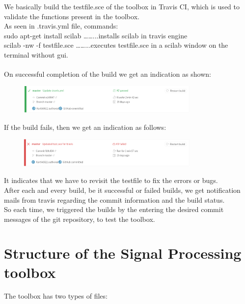 \documentclass[12pt,a4paper]{report}
\begin{document}
We basically build the testfile.sce of the toolbox in Travis CI, which is used to validate the functions present in the toolbox. \\
As seen in .travis.yml file, commands:\\
    sudo apt-get install scilab      ……...installs scilab in travis engine\\
    scilab -nw -f testfile.sce         ……...executes testfile.sce in a scilab window on the terminal without gui.\\\\

On successful completion of the build we get an indication as shown:\\
\begin{figure}[H]
\centering
\includegraphics[width = 0.8\textwidth]{travissuccess.png}
\end{figure}


If the build fails, then we get an indication as follows:\\
\begin{figure}[H]
\centering
\includegraphics[width = 0.8\textwidth]{travisfail.png}
\end{figure}
It indicates that we have to revisit the testfile to fix the errors or bugs.\\
After each and every build, be it successful or failed builds, we get notification mails from travis regarding the commit information and the build status.\\
So each time, we triggered the builds by the entering the desired commit messages of the git repository, to test the toolbox.

\newpage













\chapter{\textbf{Structure of the Signal Processing toolbox}}
The toolbox has two types of files:
\end{document}
